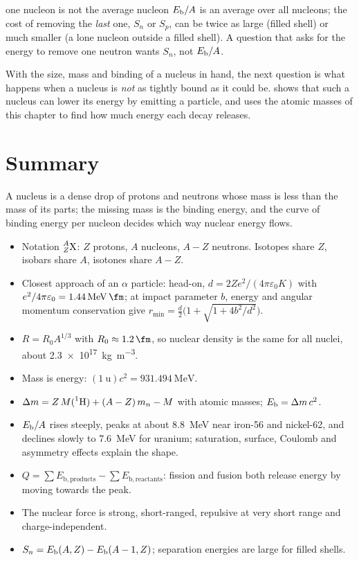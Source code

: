\begin{trapbox}{one nucleon is not the average nucleon}
$E_{\mathrm{b}}/A$ is an average over all nucleons; the cost of removing the \emph{last} one, $S_n$ or $S_p$, can
be twice as large (filled shell) or much smaller (a lone nucleon outside a filled shell). A question that
asks for the energy to remove one neutron wants $S_n$, not $E_{\mathrm{b}}/A$.
\end{trapbox}

With the size, mass and binding of a nucleus in hand, the next question is what happens when a nucleus
is \emph{not} as tightly bound as it could be.  shows that such a nucleus can lower its
energy by emitting a particle, and uses the atomic masses of this chapter to find how much energy each
decay releases.

\section{Summary}\label{sec:nuc-summary}
A nucleus is a dense drop of protons and neutrons whose mass is less than the mass of its parts; the
missing mass is the binding energy, and the curve of binding energy per nucleon decides which way
nuclear energy flows.

\begin{itemize}
\item Notation $\prescript{A}{Z}{\mathrm{X}}$: $Z$ protons, $A$ nucleons, $A-Z$ neutrons. Isotopes share $Z$, isobars
share $A$, isotones share $A-Z$.
\item Closest approach of an $\alpha$ particle: head-on, $d=2Ze^2/(4\pi\varepsilon_0K)$ with
$e^2/4\pi\varepsilon_0=\SI{1.44}{\MeV.\fm}$; at impact parameter $b$, energy and angular momentum
conservation give $r_{\min}=\tfrac{d}{2}\big(1+\sqrt{1+4b^2/d^2}\big)$.
\item $R=R_0A^{1/3}$ with $R_0\approx\SI{1.2}{\fm}$, so nuclear density is the same for all nuclei,
about \SI{2.3e17}{kg.m^{-3}}.
\item Mass is energy: $(\SI{1}{\amu})c^2=\SI{931.494}{\MeV}$.
\item $\Delta m=Z\,M(\prescript{1}{}{\mathrm{H}})+(A-Z)\,m_n-M$ with atomic masses; $E_{\mathrm{b}}=\Delta m\,c^2$.
\item $E_{\mathrm{b}}/A$ rises steeply, peaks at about \SI{8.8}{\MeV} near iron-56 and nickel-62, and declines slowly
to \SI{7.6}{\MeV} for uranium; saturation, surface, Coulomb and asymmetry effects explain the shape.
\item $Q=\sum E_{\mathrm b,\text{products}}-\sum E_{\mathrm b,\text{reactants}}$: fission and fusion both
release energy by moving towards the peak.
\item The nuclear force is strong, short-ranged, repulsive at very short range and charge-independent.
\item $S_n=E_{\mathrm{b}}(A,Z)-E_{\mathrm{b}}(A-1,Z)$; separation energies are large for filled shells.
\end{itemize}

